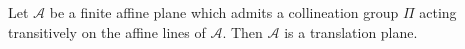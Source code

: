Let $\mathcal{A}$ be a finite affine plane which admits a collineation group $\Pi$ acting transitively on the affine lines of $\mathcal{A}$. Then $\mathcal{A}$ is a translation plane.
